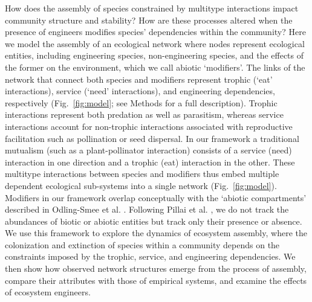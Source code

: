 \documentclass[twocolumn,preprintnumbers,amsmath,amssymb,superscriptaddress,linenumbers]{revtex4-1}
\begin{document}
How does the assembly of species constrained by multitype interactions impact community structure and stability?
How are these processes altered when the presence of engineers modifies species' dependencies within the community?
Here we model the assembly of an ecological network where nodes represent ecological entities, including engineering species, non-engineering species, and the effects of the former on the environment, which we call abiotic `modifiers'.
The links of the network that connect both species and modifiers represent trophic (`eat' interactions), service (`need' interactions), and engineering dependencies, respectively (Fig.\ \ref{fig:model}; see Methods for a full description).
Trophic interactions represent both predation as well as parasitism, whereas service interactions account for non-trophic interactions associated with reproductive facilitation such as pollination or seed dispersal.
In our framework a traditional mutualism (such as a plant-pollinator interaction) consists of a service (need) interaction in one direction and a trophic (eat) interaction in the other.
These multitype interactions between species and modifiers thus embed multiple dependent ecological sub-systems into a single network (Fig.\ \ref{fig:model}). %
Modifiers in our framework overlap conceptually with the `abiotic compartments' described in Odling-Smee et al. \cite{OdlingSmee2013}.
Following Pillai et al. \cite{Pillai2011}, we do not track the abundances of biotic or abiotic entities but track only their presence or absence.
We use this framework to explore the dynamics of ecosystem assembly, where the colonization and extinction of species within a community depends on the constraints imposed by the trophic, service, and engineering dependencies.
We then show how observed network structures emerge from the process of assembly, compare their attributes with those of empirical systems, and examine the effects of ecosystem engineers.
\end{document}

